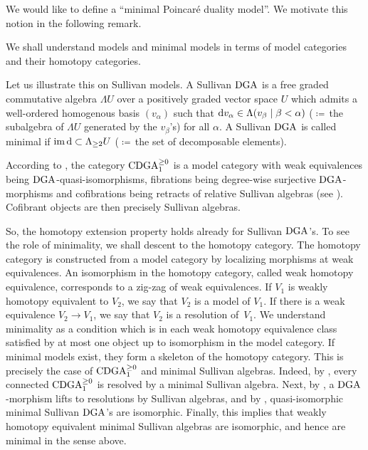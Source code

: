 \documentclass[\MainFolder/Text.tex]{subfiles}
\begin{document}
We would like to define a ``minimal Poincar\'e duality model''. We motivate this notion in the following remark.

\begin{Remark}\label{Rem:Models}
We shall understand models and minimal models in terms of model categories and their homotopy categories.

Let us illustrate this on Sullivan models. A Sullivan $\mathrm{DGA}$ is a free graded commutative algebra $\Lambda U$ over a positively graded vector space $U$ which admits a well-ordered homogenous basis $(v_\alpha)$ such that $\mathrm{d} v_\alpha \in \Lambda(v_\beta \mid \beta < \alpha)$ ($\coloneqq$\,the subalgebra of $\Lambda U$ generated by the $v_\beta$'s) for all $\alpha$. A Sullivan $\mathrm{DGA}$ is called minimal if $\operatorname{im} \mathrm{d} \subset \Lambda_{\ge 2} U$ ($\coloneqq$\,the set of decomposable elements).

According to \cite[Theorem~4.3]{Bousfield1976}, the category $\mathrm{CDGA}_{1}^{\ge 0}$ is a model category with weak equivalences being $\mathrm{DGA}$-quasi-isomorphisms, fibrations being degree-wise surjective $\mathrm{DGA}$-morphisms and cofibrations being retracts of relative Sullivan algebras (see \cite[Proposition~2.22 and Proposition~2.28]{Felix2008}). Cofibrant objects are then precisely Sullivan algebras. 

So, the homotopy extension property holds already for Sullivan $\mathrm{DGA}$'s. To see the role of minimality, we shall descent to the homotopy category. The homotopy category is constructed from a model category by localizing morphisms at weak equivalences. An isomorphism in the homotopy category, called weak homotopy equivalence, corresponds to a zig-zag of weak equivalences. If $V_1$ is weakly homotopy equivalent to $V_2$, we say that $V_2$ is a model of $V_1$. If there is a weak equivalence $V_2 \rightarrow V_1$, we say that $V_2$ is a resolution of~$V_1$. We understand minimality as a condition which is in each weak homotopy equivalence class satisfied by at most one object up to isomorphism in the model category. If minimal models exist, they form a skeleton of the homotopy category. This is precisely the case of $\mathrm{CDGA}_{1}^{\ge 0}$ and minimal Sullivan algebras. Indeed, by \cite[Theorem~2.24]{Felix2008}, every connected $\mathrm{CDGA}_{1}^{\ge 0}$ is resolved by a minimal Sullivan algebra. Next, by \cite[Proposition~2.26]{Felix2008}, a $\mathrm{DGA}$-morphism lifts to resolutions by Sullivan algebras, and by \cite[Corollary~2.13]{Felix2008}, quasi-isomorphic minimal Sullivan $\mathrm{DGA}$'s are isomorphic. Finally, this implies that weakly homotopy equivalent minimal Sullivan algebras are isomorphic, and hence are minimal in the sense above.


\end{Remark}
\end{document}
